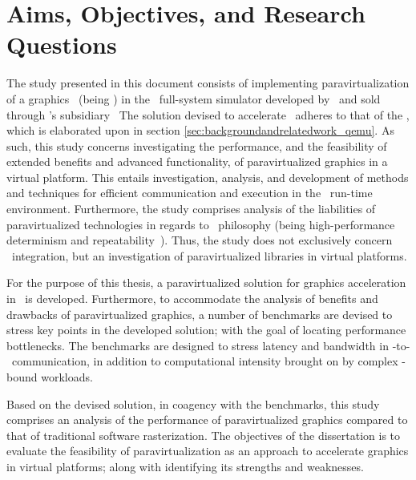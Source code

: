 
\chapter{Aims, Objectives, and Research Questions}
\label{cha:aimsandobjectives}
The study presented in this document consists of implementing paravirtualization of a graphics \dvttermapi\ (being \dvttermopenglestwopointo ) in the \dvttermsimics\ full-system simulator developed by \dvttermintel\ and sold through \dvttermintel 's subsidiary \dvttermwindriver\ 
The solution devised to accelerate \dvttermopengl\ adheres to that of the \dvttermandroidemulator , which is elaborated upon in section \ref{sec:backgroundandrelatedwork_qemu}.
As such, this study concerns investigating the performance, and the feasibility of extended benefits and advanced functionality, of paravirtualized graphics in a virtual platform.
This entails investigation, analysis, and development of methods and techniques for efficient communication and execution in the \dvttermsimics\ run-time environment.
Furthermore, the study comprises analysis of the liabilities of paravirtualized technologies in regards to \dvttermsimics\ philosophy (being high-performance determinism and repeatability~).
Thus, the study does not exclusively concern \dvttermsimics\ integration, but an investigation of paravirtualized libraries in virtual platforms.

For the purpose of this thesis, a paravirtualized solution for graphics acceleration in \dvttermsimics\ is developed.
Furthermore, to accommodate the analysis of benefits and drawbacks of paravirtualized graphics, a number of benchmarks are devised to stress key points in the developed solution; with the goal of locating performance bottlenecks.
The benchmarks are designed to stress latency and bandwidth in \dvttermtarget -to-\dvttermhost\ communication, in addition to computational intensity brought on by complex \dvttermgpu -bound workloads.

Based on the devised solution, in coagency with the benchmarks, this study comprises an analysis of the performance of paravirtualized graphics compared to that of traditional software rasterization.
The objectives of the dissertation is to evaluate the feasibility of paravirtualization as an approach to accelerate graphics in virtual platforms; along with identifying its strengths and weaknesses.

